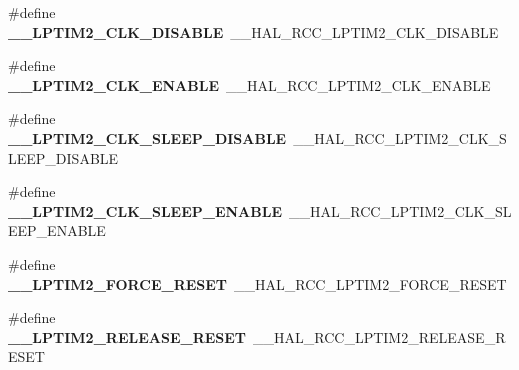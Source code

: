 \begin{DoxyCompactItemize}
\item 
\hypertarget{group___h_a_l___r_c_c___aliased_gae4daf45ea16d3d30f8118ca34c8a4519}{\#define {\bfseries \-\_\-\-\_\-\-L\-P\-T\-I\-M2\-\_\-\-C\-L\-K\-\_\-\-D\-I\-S\-A\-B\-L\-E}~\-\_\-\-\_\-\-H\-A\-L\-\_\-\-R\-C\-C\-\_\-\-L\-P\-T\-I\-M2\-\_\-\-C\-L\-K\-\_\-\-D\-I\-S\-A\-B\-L\-E}\label{group___h_a_l___r_c_c___aliased_gae4daf45ea16d3d30f8118ca34c8a4519}

\item 
\hypertarget{group___h_a_l___r_c_c___aliased_gabb780b00e76662c8ea7f55b1d333ba17}{\#define {\bfseries \-\_\-\-\_\-\-L\-P\-T\-I\-M2\-\_\-\-C\-L\-K\-\_\-\-E\-N\-A\-B\-L\-E}~\-\_\-\-\_\-\-H\-A\-L\-\_\-\-R\-C\-C\-\_\-\-L\-P\-T\-I\-M2\-\_\-\-C\-L\-K\-\_\-\-E\-N\-A\-B\-L\-E}\label{group___h_a_l___r_c_c___aliased_gabb780b00e76662c8ea7f55b1d333ba17}

\item 
\hypertarget{group___h_a_l___r_c_c___aliased_ga5521c5857e0afe9d16e1649f3099cfbb}{\#define {\bfseries \-\_\-\-\_\-\-L\-P\-T\-I\-M2\-\_\-\-C\-L\-K\-\_\-\-S\-L\-E\-E\-P\-\_\-\-D\-I\-S\-A\-B\-L\-E}~\-\_\-\-\_\-\-H\-A\-L\-\_\-\-R\-C\-C\-\_\-\-L\-P\-T\-I\-M2\-\_\-\-C\-L\-K\-\_\-\-S\-L\-E\-E\-P\-\_\-\-D\-I\-S\-A\-B\-L\-E}\label{group___h_a_l___r_c_c___aliased_ga5521c5857e0afe9d16e1649f3099cfbb}

\item 
\hypertarget{group___h_a_l___r_c_c___aliased_ga1befaabde57db93bcf04e28dffd1d468}{\#define {\bfseries \-\_\-\-\_\-\-L\-P\-T\-I\-M2\-\_\-\-C\-L\-K\-\_\-\-S\-L\-E\-E\-P\-\_\-\-E\-N\-A\-B\-L\-E}~\-\_\-\-\_\-\-H\-A\-L\-\_\-\-R\-C\-C\-\_\-\-L\-P\-T\-I\-M2\-\_\-\-C\-L\-K\-\_\-\-S\-L\-E\-E\-P\-\_\-\-E\-N\-A\-B\-L\-E}\label{group___h_a_l___r_c_c___aliased_ga1befaabde57db93bcf04e28dffd1d468}

\item 
\hypertarget{group___h_a_l___r_c_c___aliased_ga65872113839cb5569f584e6373e2e006}{\#define {\bfseries \-\_\-\-\_\-\-L\-P\-T\-I\-M2\-\_\-\-F\-O\-R\-C\-E\-\_\-\-R\-E\-S\-E\-T}~\-\_\-\-\_\-\-H\-A\-L\-\_\-\-R\-C\-C\-\_\-\-L\-P\-T\-I\-M2\-\_\-\-F\-O\-R\-C\-E\-\_\-\-R\-E\-S\-E\-T}\label{group___h_a_l___r_c_c___aliased_ga65872113839cb5569f584e6373e2e006}

\item 
\hypertarget{group___h_a_l___r_c_c___aliased_gadd807afbe3725b62026e46e99531efac}{\#define {\bfseries \-\_\-\-\_\-\-L\-P\-T\-I\-M2\-\_\-\-R\-E\-L\-E\-A\-S\-E\-\_\-\-R\-E\-S\-E\-T}~\-\_\-\-\_\-\-H\-A\-L\-\_\-\-R\-C\-C\-\_\-\-L\-P\-T\-I\-M2\-\_\-\-R\-E\-L\-E\-A\-S\-E\-\_\-\-R\-E\-S\-E\-T}\label{group___h_a_l___r_c_c___aliased_gadd807afbe3725b62026e46e99531efac}


\end{DoxyCompactItemize}

